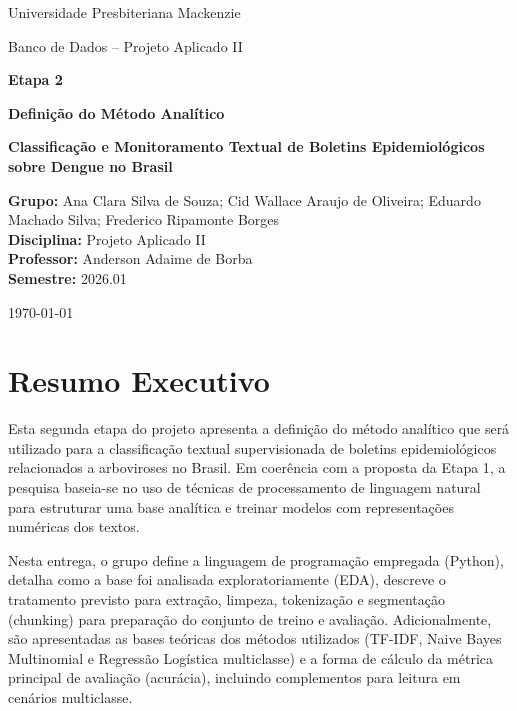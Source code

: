 \documentclass[12pt,a4paper]{article}
\begin{document}
\hypersetup{pageanchor=false}

\begin{titlepage}
    \centering
    {\large Universidade Presbiteriana Mackenzie \par}
    \vspace{0.4cm}
    {\large Banco de Dados – Projeto Aplicado II \par}
    \vspace{2.0cm}
    {\Large \textbf{Etapa 2} \par}
    \vspace{0.4cm}
    {\large \textbf{Definição do Método Analítico} \par}
    \vspace{1.4cm}
    {\Large \textbf{Classificação e Monitoramento Textual de Boletins Epidemiológicos sobre Dengue no Brasil} \par}
    \vfill

    \begin{flushleft}
    \textbf{Grupo:} Ana Clara Silva de Souza; Cid Wallace Araujo de Oliveira; Eduardo Machado Silva; Frederico Ripamonte Borges \\
    \textbf{Disciplina:} Projeto Aplicado II \\
    \textbf{Professor:} Anderson Adaime de Borba \\
    \textbf{Semestre:} 2026.01
    \end{flushleft}

    \vfill
    {\large \today \par}
\end{titlepage}

\clearpage
\hypersetup{pageanchor=true}
\setcounter{page}{1}

\section*{Resumo Executivo}

Esta segunda etapa do projeto apresenta a definição do método analítico que será utilizado para a classificação textual supervisionada de boletins epidemiológicos relacionados a arboviroses no Brasil. Em coerência com a proposta da Etapa 1, a pesquisa baseia-se no uso de técnicas de processamento de linguagem natural para estruturar uma base analítica e treinar modelos com representações numéricas dos textos.

Nesta entrega, o grupo define a linguagem de programação empregada (Python), detalha como a base foi analisada exploratoriamente (EDA), descreve o tratamento previsto para extração, limpeza, tokenização e segmentação (chunking) para preparação do conjunto de treino e avaliação. Adicionalmente, são apresentadas as bases teóricas dos métodos utilizados (TF-IDF, Naive Bayes Multinomial e Regressão Logística multiclasse) e a forma de cálculo da métrica principal de avaliação (acurácia), incluindo complementos para leitura em cenários multiclasse.
\end{document}

